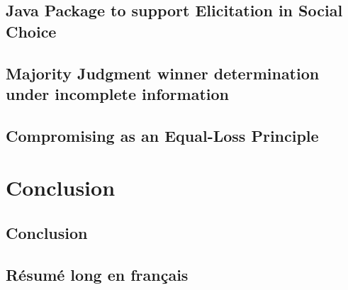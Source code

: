 \documentclass[a4paper, 11pt,oneside]{book}
\begin{document}
	\chapter{Java Package to support Elicitation in Social Choice}
		\label{ch:uml}
		
	\chapter{Majority Judgment winner determination under incomplete information}
		\label{ch:MJ}
		

	\chapter{Compromising as an Equal-Loss Principle}
	\label{ch:compromise}
		

\part{Conclusion}
	\chapter{Conclusion}
		\label{ch:conclusion}
		




\backmatter
{}



 

\chapter{Résumé long en français}

\end{document}
